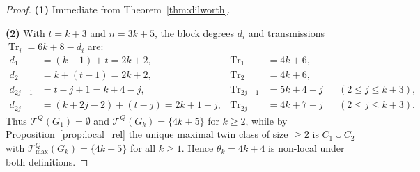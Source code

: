 \documentclass[11pt,a4paper]{article}
\theoremstyle{definition}
\DeclareMathOperator{\Tr}{Tr}
\begin{document}
\begin{proof}
  \textbf{(1)} Immediate from Theorem~\ref{thm:dilworth}.

  \textbf{(2)} With $t = k+3$ and $n = 3k+5$, the block degrees $d_i$ and transmissions $\Tr_i = 6k+8-d_i$ are:
  \begin{align*}
    d_1 &= (k-1) + t = 2k+2, & \Tr_1 &= 4k+6, \\
    d_2 &= k + (t-1) = 2k+2, & \Tr_2 &= 4k+6, \\
    d_{2j-1} &= t - j + 1 = k + 4 - j, & \Tr_{2j-1} &= 5k + 4 + j && (2 \le j \le k+3), \\
    d_{2j} &= (k + 2j - 2) + (t - j) = 2k + 1 + j, & \Tr_{2j} &= 4k + 7 - j && (2 \le j \le k+3).
  \end{align*}
  Thus $\mathcal{T}^Q(G_1) = \emptyset$ and $\mathcal{T}^Q(G_k) = \{4k+5\}$ for $k \ge 2$, while by Proposition~\ref{prop:local_rel} the unique maximal twin class of size $\ge 2$ is $C_1 \cup C_2$ with $\mathcal{T}^Q_{\max}(G_k) = \{4k+5\}$ for all $k \ge 1$. Hence $\theta_k = 4k+4$ is non-local under both definitions.


\end{proof}
\end{document}
